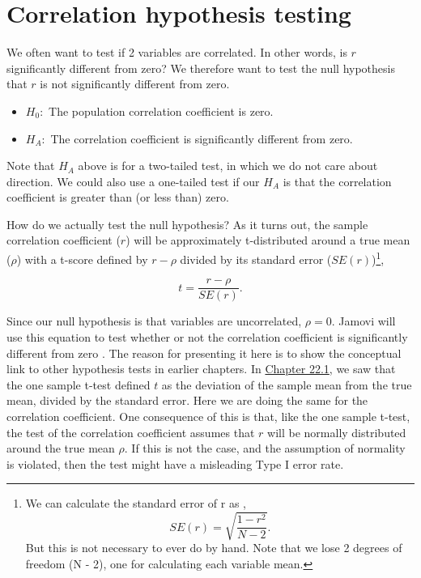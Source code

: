 \documentclass[
]{scrbook}
\providecommand{\tightlist}{%
  \setlength{\itemsep}{0pt}\setlength{\parskip}{0pt}}
\begin{document}
\hypertarget{correlation-hypothesis-testing}{%
\section{Correlation hypothesis testing}\label{correlation-hypothesis-testing}}

We often want to test if 2 variables are correlated.
In other words, is \(r\) significantly different from zero?
We therefore want to test the null hypothesis that \(r\) is not significantly different from zero.

\begin{itemize}
\tightlist
\item
  \(H_{0}:\) The population correlation coefficient is zero.
\item
  \(H_{A}:\) The correlation coefficient is significantly different from zero.
\end{itemize}

Note that \(H_{A}\) above is for a two-tailed test, in which we do not care about direction.
We could also use a one-tailed test if our \(H_{A}\) is that the correlation coefficient is greater than (or less than) zero.

How do we actually test the null hypothesis?
As it turns out, the sample correlation coefficient (\(r\)) will be approximately t-distributed around a true mean (\(\rho\)) with a t-score defined by \(r - \rho\) divided by its standard error (\(SE(r)\))\footnote{We can calculate the standard error of r as \citep{Rahman1968}, \[SE(r) = \sqrt{\frac{1 - r^{2}}{N - 2}}.\] But this is not necessary to ever do by hand. Note that we lose 2 degrees of freedom (N - 2), one for calculating each variable mean.},

\[t = \frac{r - \rho}{SE(r)}.\]

Since our null hypothesis is that variables are uncorrelated, \(\rho = 0\).
Jamovi will use this equation to test whether or not the correlation coefficient is significantly different from zero \citep{Jamovi2022}.
The reason for presenting it here is to show the conceptual link to other hypothesis tests in earlier chapters.
In \protect\hyperlink{one-sample-t-test}{Chapter 22.1}, we saw that the one sample t-test defined \(t\) as the deviation of the sample mean from the true mean, divided by the standard error.
Here we are doing the same for the correlation coefficient.
One consequence of this is that, like the one sample t-test, the test of the correlation coefficient assumes that \(r\) will be normally distributed around the true mean \(\rho\).
If this is not the case, and the assumption of normality is violated, then the test might have a misleading Type I error rate.
\end{document}
